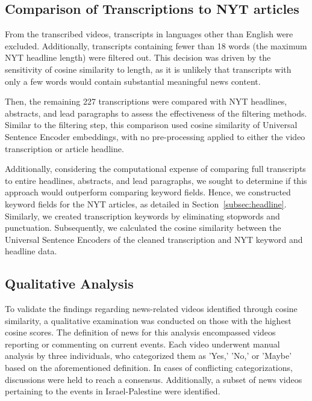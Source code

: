 \documentclass{article}
\begin{document}
\subsection{Comparison of Transcriptions to NYT articles}
From the transcribed videos, transcripts in languages other than English were excluded. Additionally, transcripts containing fewer than 18 words (the maximum NYT headline length) were filtered out. This decision was driven by the sensitivity of cosine similarity to length, as it is unlikely that transcripts with only a few words would contain substantial meaningful news content. \newline

{\noindent}Then, the remaining 227 transcriptions were compared with NYT headlines, abstracts, and lead paragraphs to assess the effectiveness of the filtering methods. Similar to the filtering step, this comparison used cosine similarity of Universal Sentence Encoder embeddings, with no pre-processing applied to either the video transcription or article headline.\newline

{\noindent}Additionally, considering the computational expense of comparing full transcripts to entire headlines, abstracts, and lead paragraphs, we sought to determine if this approach would outperform comparing keyword fields. Hence, we constructed keyword fields for the NYT articles, as detailed in Section~\ref{subsec:headline}. Similarly, we created transcription keywords by eliminating stopwords and punctuation. Subsequently, we calculated the cosine similarity between the Universal Sentence Encoders of the cleaned transcription and NYT keyword and headline data.

\subsection{Qualitative Analysis}
To validate the findings regarding news-related videos identified through cosine similarity, a qualitative examination was conducted on those with the highest cosine scores. The definition of news for this analysis encompassed videos reporting or commenting on current events. Each video underwent manual analysis by three individuals, who categorized them as 'Yes,' 'No,' or 'Maybe' based on the aforementioned definition. In cases of conflicting categorizations, discussions were held to reach a consensus. Additionally, a subset of news videos pertaining to the events in Israel-Palestine were identified.
\end{document}
